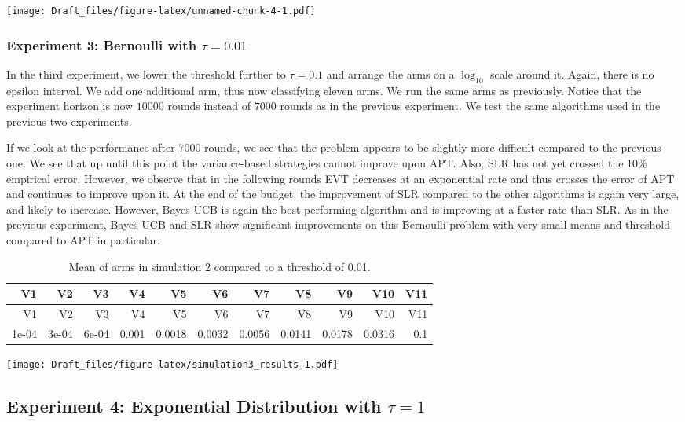\documentclass[12pt,]{article}
\begin{document}
\texttt{[image: Draft\_files/figure-latex/unnamed-chunk-4-1.pdf]}

\subsubsection{\texorpdfstring{Experiment 3: Bernoulli with
\(\tau = 0.01\)}{Experiment 3: Bernoulli with \textbackslash{}tau = 0.01}}\label{experiment-3-bernoulli-with-tau-0.01}

In the third experiment, we lower the threshold further to
\(\tau = 0.1\) and arrange the arms on a \(\log_{10}\) scale around it.
Again, there is no epsilon interval. We add one additional arm, thus now
classifying eleven arms. We run the same arms as previously. Notice that
the experiment horizon is now \(10000\) rounds instead of \(7000\)
rounds as in the previous experiment. We test the same algorithms used
in the previous two experiments.

If we look at the performance after 7000 rounds, we see that the problem
appears to be slightly more difficult compared to the previous one. We
see that up until this point the variance-based strategies cannot
improve upon APT. Also, SLR has not yet crossed the 10\% empirical
error. However, we observe that in the following rounds EVT decreases at
an exponential rate and thus crosses the error of APT and continues to
improve upon it. At the end of the budget, the improvement of SLR
compared to the other algorithms is again very large, and likely to
increase. However, Bayes-UCB is again the best performing algorithm and
is improving at a faster rate than SLR. As in the previous experiment,
Bayes-UCB and SLR show significant improvements on this Bernoulli
problem with very small means and threshold compared to APT in
particular.

\begin{longtable}[]{@{}rrrrrrrrrrr@{}}
\caption{Mean of arms in simulation 2 compared to a threshold of
0.01.}\tabularnewline
\toprule
V1 & V2 & V3 & V4 & V5 & V6 & V7 & V8 & V9 & V10 & V11\tabularnewline
\midrule
\endfirsthead
\toprule
V1 & V2 & V3 & V4 & V5 & V6 & V7 & V8 & V9 & V10 & V11\tabularnewline
\midrule
\endhead
1e-04 & 3e-04 & 6e-04 & 0.001 & 0.0018 & 0.0032 & 0.0056 & 0.0141 &
0.0178 & 0.0316 & 0.1\tabularnewline
\bottomrule
\end{longtable}

\texttt{[image: Draft\_files/figure-latex/simulation3\_results-1.pdf]}

\subsection{\texorpdfstring{Experiment 4: Exponential Distribution with
\(\tau = 1\)}{Experiment 4: Exponential Distribution with \textbackslash{}tau = 1}}\label{experiment-4-exponential-distribution-with-tau-1}
\end{document}

